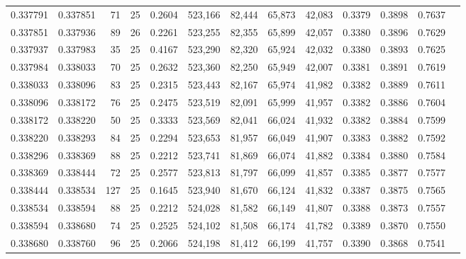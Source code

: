\begin{tabular}{rrrrrrrrrrrrr}
0.337791 & 0.337851 &    71 &  25 &                                     0.2604 & 523,166 &  82,444 &  65,873 &  42,083 & 0.3379 & 0.3898 & 0.7637 \\
0.337851 & 0.337936 &    89 &  26 &                                     0.2261 & 523,255 &  82,355 &  65,899 &  42,057 & 0.3380 & 0.3896 & 0.7629 \\
0.337937 & 0.337983 &    35 &  25 &                                     0.4167 & 523,290 &  82,320 &  65,924 &  42,032 & 0.3380 & 0.3893 & 0.7625 \\
0.337984 & 0.338033 &    70 &  25 &                                     0.2632 & 523,360 &  82,250 &  65,949 &  42,007 & 0.3381 & 0.3891 & 0.7619 \\
0.338033 & 0.338096 &    83 &  25 &                                     0.2315 & 523,443 &  82,167 &  65,974 &  41,982 & 0.3382 & 0.3889 & 0.7611 \\
0.338096 & 0.338172 &    76 &  25 &                                     0.2475 & 523,519 &  82,091 &  65,999 &  41,957 & 0.3382 & 0.3886 & 0.7604 \\
0.338172 & 0.338220 &    50 &  25 &                                     0.3333 & 523,569 &  82,041 &  66,024 &  41,932 & 0.3382 & 0.3884 & 0.7599 \\
0.338220 & 0.338293 &    84 &  25 &                                     0.2294 & 523,653 &  81,957 &  66,049 &  41,907 & 0.3383 & 0.3882 & 0.7592 \\
0.338296 & 0.338369 &    88 &  25 &                                     0.2212 & 523,741 &  81,869 &  66,074 &  41,882 & 0.3384 & 0.3880 & 0.7584 \\
0.338369 & 0.338444 &    72 &  25 &                                     0.2577 & 523,813 &  81,797 &  66,099 &  41,857 & 0.3385 & 0.3877 & 0.7577 \\
0.338444 & 0.338534 &   127 &  25 &                                     0.1645 & 523,940 &  81,670 &  66,124 &  41,832 & 0.3387 & 0.3875 & 0.7565 \\
0.338534 & 0.338594 &    88 &  25 &                                     0.2212 & 524,028 &  81,582 &  66,149 &  41,807 & 0.3388 & 0.3873 & 0.7557 \\
0.338594 & 0.338680 &    74 &  25 &                                     0.2525 & 524,102 &  81,508 &  66,174 &  41,782 & 0.3389 & 0.3870 & 0.7550 \\
0.338680 & 0.338760 &    96 &  25 &                                     0.2066 & 524,198 &  81,412 &  66,199 &  41,757 & 0.3390 & 0.3868 & 0.7541 \\

\end{tabular}
